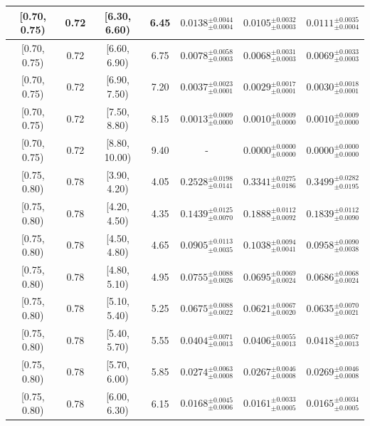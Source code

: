 \begin{longtable}{|c|c|c|c|c|c|c|}
\hline
[0.70, 0.75) & 0.72 & [6.30, 6.60) & 6.45 & $0.0138^{ \pm 0.0044 }_{ \pm 0.0004 }$ & $0.0105^{ \pm 0.0032 }_{ \pm 0.0003 }$ & $0.0111^{ \pm 0.0035 }_{ \pm 0.0004 }$ \\ 
\hline
[0.70, 0.75) & 0.72 & [6.60, 6.90) & 6.75 & $0.0078^{ \pm 0.0058 }_{ \pm 0.0003 }$ & $0.0068^{ \pm 0.0031 }_{ \pm 0.0003 }$ & $0.0069^{ \pm 0.0033 }_{ \pm 0.0003 }$ \\ 
\hline
[0.70, 0.75) & 0.72 & [6.90, 7.50) & 7.20 & $0.0037^{ \pm 0.0023 }_{ \pm 0.0001 }$ & $0.0029^{ \pm 0.0017 }_{ \pm 0.0001 }$ & $0.0030^{ \pm 0.0018 }_{ \pm 0.0001 }$ \\ 
\hline
[0.70, 0.75) & 0.72 & [7.50, 8.80) & 8.15 & $0.0013^{ \pm 0.0009 }_{ \pm 0.0000 }$ & $0.0010^{ \pm 0.0009 }_{ \pm 0.0000 }$ & $0.0010^{ \pm 0.0009 }_{ \pm 0.0000 }$ \\ 
\hline
[0.70, 0.75) & 0.72 & [8.80, 10.00) & 9.40 & - & $0.0000^{ \pm 0.0000 }_{ \pm 0.0000 }$ & $0.0000^{ \pm 0.0000 }_{ \pm 0.0000 }$ \\ 
\hline
[0.75, 0.80) & 0.78 & [3.90, 4.20) & 4.05 & $0.2528^{ \pm 0.0198 }_{ \pm 0.0141 }$ & $0.3341^{ \pm 0.0275 }_{ \pm 0.0186 }$ & $0.3499^{ \pm 0.0282 }_{ \pm 0.0195 }$ \\ 
\hline
[0.75, 0.80) & 0.78 & [4.20, 4.50) & 4.35 & $0.1439^{ \pm 0.0125 }_{ \pm 0.0070 }$ & $0.1888^{ \pm 0.0112 }_{ \pm 0.0092 }$ & $0.1839^{ \pm 0.0112 }_{ \pm 0.0090 }$ \\ 
\hline
[0.75, 0.80) & 0.78 & [4.50, 4.80) & 4.65 & $0.0905^{ \pm 0.0113 }_{ \pm 0.0035 }$ & $0.1038^{ \pm 0.0094 }_{ \pm 0.0041 }$ & $0.0958^{ \pm 0.0090 }_{ \pm 0.0038 }$ \\ 
\hline
[0.75, 0.80) & 0.78 & [4.80, 5.10) & 4.95 & $0.0755^{ \pm 0.0088 }_{ \pm 0.0026 }$ & $0.0695^{ \pm 0.0069 }_{ \pm 0.0024 }$ & $0.0686^{ \pm 0.0068 }_{ \pm 0.0024 }$ \\ 
\hline
[0.75, 0.80) & 0.78 & [5.10, 5.40) & 5.25 & $0.0675^{ \pm 0.0088 }_{ \pm 0.0022 }$ & $0.0621^{ \pm 0.0067 }_{ \pm 0.0020 }$ & $0.0635^{ \pm 0.0070 }_{ \pm 0.0021 }$ \\ 
\hline
[0.75, 0.80) & 0.78 & [5.40, 5.70) & 5.55 & $0.0404^{ \pm 0.0071 }_{ \pm 0.0013 }$ & $0.0406^{ \pm 0.0055 }_{ \pm 0.0013 }$ & $0.0418^{ \pm 0.0057 }_{ \pm 0.0013 }$ \\ 
\hline
[0.75, 0.80) & 0.78 & [5.70, 6.00) & 5.85 & $0.0274^{ \pm 0.0063 }_{ \pm 0.0008 }$ & $0.0267^{ \pm 0.0046 }_{ \pm 0.0008 }$ & $0.0269^{ \pm 0.0046 }_{ \pm 0.0008 }$ \\ 
\hline
[0.75, 0.80) & 0.78 & [6.00, 6.30) & 6.15 & $0.0168^{ \pm 0.0045 }_{ \pm 0.0006 }$ & $0.0161^{ \pm 0.0033 }_{ \pm 0.0005 }$ & $0.0165^{ \pm 0.0034 }_{ \pm 0.0005 }$ \\ 

\end{longtable}
